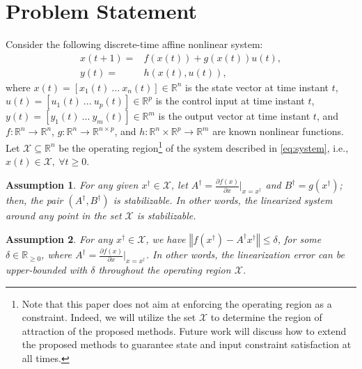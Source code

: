 \documentclass[1p,times]{elsarticle}
\newtheorem{assumption}{Assumption}
\begin{document}
\section{Problem Statement}\label{sec:PS}
Consider the following discrete-time affine  nonlinear system:
\begin{subequations}\label{eq:system}
\begin{align}
x(t+1) =& f\left(x(t)\right)+g\left(x(t)\right)u(t),\\
y(t)=&h\left(x(t),u(t)\right),
\end{align}
\end{subequations}
where $x(t)=[x_1(t)~...~x_n(t)] \in \mathbb{R}^n$ is the state vector at time instant $t$, $u(t)=[u_1(t)~...~u_p(t)] \in \mathbb{R}^p$ is the control input at time instant $t$, $y(t)=[y_1(t)~...~y_m(t)] \in \mathbb{R}^m$ is the output vector at time instant $t$, and $f:\mathbb{R}^n \rightarrow \mathbb{R}^n$, $g:\mathbb{R}^{n}\rightarrow \mathbb{R}^{n\times p}$, and $h:\mathbb{R}^n\times\mathbb{R}^p\rightarrow\mathbb{R}^m$ are known nonlinear functions. Let $\mathcal{X}\subseteq\mathbb{R}^n$ be the operating region\footnote{Note that this paper does not aim at enforcing the operating region as a constraint. Indeed, we will utilize the set $\mathcal{X}$ to determine the region of attraction of the proposed methods. Future work will discuss how to extend the proposed methods to guarantee state and input constraint satisfaction at all times.} of the system described in \eqref{eq:system}, i.e., $x(t)\in\mathcal{X},~\forall t\geq0$. 



\begin{assumption}\label{Assumption:Linearization}
For any given $x^\dag\in\mathcal{X}$, let $A^\dag=\frac{\partial f(x)}{\partial x}|_{x=x^\dag}$ and $B^\dag=g(x^\dag)$; then, the pair $(A^\dag,B^\dag)$ is stabilizable. In other words, the linearized system around any point in the set $\mathcal{X}$ is stabilizable. 
\end{assumption}


\begin{assumption}\label{assumption:Lipchitz}
For any $x^\dag\in\mathcal{X}$, we have $\left\Vert f(x^\dag)-A^\dag x^\dag\right\Vert\leq\delta$, for some $\delta\in\mathbb{R}_{\geq0}$, where $A^\dag=\frac{\partial f(x)}{\partial x}|_{x=x^\dag}$. In other words, the linearization error can be upper-bounded with $\delta$ throughout the operating region $\mathcal{X}$. 
\end{assumption}
\end{document}
